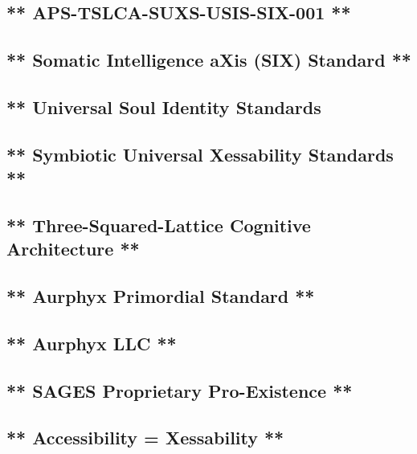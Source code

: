 \subsection{** APS-TSLCA-SUXS-USIS-SIX-001 **}\label{aps-tslca-suxs-usis-six-001}

\subsection{** Somatic Intelligence aXis (SIX) Standard **}\label{sensorimotor-integration-axis-six-standard}

\subsection{** Universal Soul Identity Standards}\label{universal-soul-identity-standards}

\subsection{** Symbiotic Universal Xessability Standards **}\label{symbiotic-universal-xessability-standards}

\subsection{** Three-Squared-Lattice Cognitive Architecture **}\label{three-squared-lattice-cognitive-architecture}

\subsection{** Aurphyx Primordial Standard **}\label{aurphyx-primordial-standard}

\subsection{** Aurphyx LLC **}\label{aurphyx-llc}

\subsection{** SAGES \textbar{} Proprietary \textbar{} Pro-Existence **}\label{sages-proprietary-pro-existence}

\subsection{** Accessibility = Xessability **}\label{accessibility-xessability}

